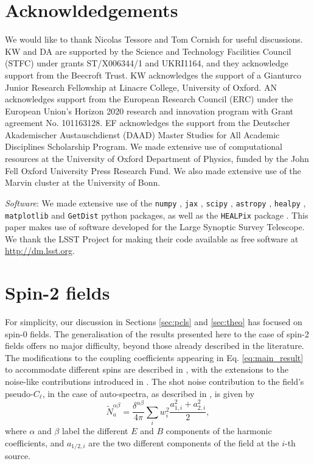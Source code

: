 \documentclass[%
 reprint,
superscriptaddress,
nofootinbib,
 amsmath,amssymb,
 aps,
 prd,
]{revtex4-2}
\begin{document}
\section*{Acknowldedgements}
  We would like to thank Nicolas Tessore and Tom Cornish for useful discussions. KW and DA are supported by the Science and Technology Facilities Council (STFC) under grants ST/X006344/1 and UKRI1164, and they acknowledge support from the Beecroft Trust. KW acknowledges the support of a Gianturco Junior Research Fellowship at Linacre College, University of Oxford. AN acknowledges support from the European Research Council (ERC) under the European Union’s Horizon 2020 research and innovation program with Grant agreement No. 101163128. EF acknowledges the support from the Deutscher Akademischer Austauschdienst (DAAD) Master Studies for All Academic Disciplines Scholarship Program. We made extensive use of computational resources at the University of Oxford Department of Physics, funded by the John Fell Oxford University Press Research Fund. We also made extensive use of the Marvin cluster at the University of Bonn.

  \emph{Software}:  We made extensive use of the {\tt numpy} \citep{oliphant2006guide, van2011numpy}, {\tt jax} \citep{jax2018github}, {\tt scipy} \citep{2020SciPy-NMeth}, {\tt astropy} \citep{1307.6212, 1801.02634}, {\tt healpy} \citep{Zonca2019}, {\tt matplotlib} \citep{2007CSE.....9...90H} and {\tt GetDist} \citep{Lewis:2019xzd} python packages, as well as the {\tt HEALPix} package \cite{astro-ph/0409513}. This paper makes use of software developed for the Large Synoptic Survey Telescope. We thank the LSST Project for making their code available as free software at \url{http://dm.lsst.org}. 

\onecolumngrid

\appendix
\section{Spin-2 fields}\label{app:spin_s}
  For simplicity, our discussion in Sections \ref{sec:pcls} and \ref{sec:theo} has focused on spin-0 fields. The generalisation of the results presented here to the case of spin-2 fields offers no major difficulty, beyond those already described in the literature. The modifications to the coupling coefficients appearing in Eq. \ref{eq:main_result} to accommodate different spins are described in \cite{1906.11765}, with the extensions to the noise-like contributions introduced in \cite{2010.09717}. The shot noise contribution to the field's pseudo-$C_\ell$, in the case of auto-spectra, as described in \cite{2407.21013}, is given by
  \begin{equation}
    \tilde{N}^{\alpha\beta}_a=\frac{\delta^{\alpha\beta}}{4\pi}\sum_iw_i^2\frac{a_{1,i}^2+a_{2,i}^2}{2},
  \end{equation}
  where $\alpha$ and $\beta$ label the different $E$ and $B$ components of the harmonic coefficients, and $a_{1/2,i}$ are the two different components of the field at the $i$-th source.
\end{document}
